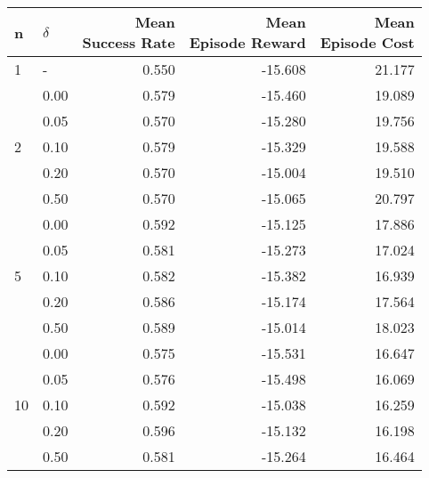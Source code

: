 \begin{tabular}{llrrr}
\toprule
n & $\delta$ & \makecell{Mean\\Success Rate} & \makecell{Mean\\Episode Reward} & \makecell{Mean\\Episode Cost} \\
\midrule
1  &   -  &             0.550 &     -15.608 &    21.177 \\
\cline{1-5}
\multirow{5}{*}{2} & 0.00 &             0.579 &     -15.460 &    19.089 \\
   & 0.05 &             0.570 &     -15.280 &    19.756 \\
   & 0.10 &             0.579 &     -15.329 &    19.588 \\
   & 0.20 &             0.570 &     -15.004 &    19.510 \\
   & 0.50 &             0.570 &     -15.065 &    20.797 \\
\cline{1-5}
\multirow{5}{*}{5} & 0.00 &             0.592 &     -15.125 &    17.886 \\
   & 0.05 &             0.581 &     -15.273 &    17.024 \\
   & 0.10 &             0.582 &     -15.382 &    16.939 \\
   & 0.20 &             0.586 &     -15.174 &    17.564 \\
   & 0.50 &             0.589 &     -15.014 &    18.023 \\
\cline{1-5}
\multirow{5}{*}{10} & 0.00 &             0.575 &     -15.531 &    16.647 \\
   & 0.05 &             0.576 &     -15.498 &    16.069 \\
   & 0.10 &             0.592 &     -15.038 &    16.259 \\
   & 0.20 &             0.596 &     -15.132 &    16.198 \\
   & 0.50 &             0.581 &     -15.264 &    16.464 \\
\bottomrule
\end{tabular}


